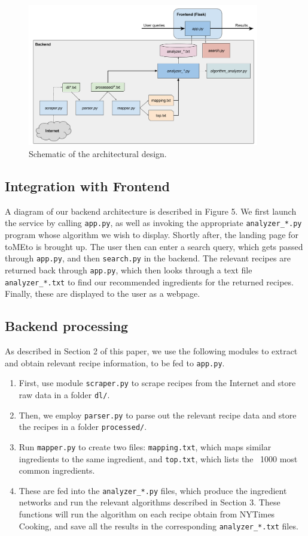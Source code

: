 \documentclass{acm_proc_article-sp}
\begin{document}
\begin{figure}[t]
	\centering
	\includegraphics[width=0.9\textwidth]{architecture}
	\caption{Schematic of the architectural design.}
	\label{fig:}
\end{figure}

\subsection{Integration with Frontend}
A diagram of our backend architecture is described in Figure 5. We first launch the service by calling \texttt{app.py}, as well as invoking the appropriate \texttt{analyzer\_*.py} program whose algorithm we wish to display. Shortly after, the landing page for toMEto is brought up. The user then can enter a search query,
which gets passed through \texttt{app.py}, and then \texttt{search.py} in the backend. The relevant
recipes are returned back through \texttt{app.py}, which then looks through a text file \texttt{analyzer\_*.txt} to find our recommended ingredients for the returned recipes. Finally, these are displayed to the user 
 as a webpage.

\subsection{Backend processing}
As described in Section 2 of this paper, we use the following
modules to extract and obtain relevant recipe information, to be fed to \texttt{app.py}.
\begin{enumerate}
	\item First, use module \texttt{scraper.py} to scrape recipes from the Internet
and store raw data in a folder \texttt{dl/}. 
	\item Then, we employ \texttt{parser.py} to parse out the relevant recipe data and store the recipes in a folder \texttt{processed/}. 
	\item Run \texttt{mapper.py} to create two files: \texttt{mapping.txt}, which maps
		similar ingredients to the same ingredient, and \texttt{top.txt}, which lists
		the ~1000 most common ingredients.
	\item These are fed into the \texttt{analyzer\_*.py} files, which produce the ingredient networks
		and run the relevant algorithms described in Section 3. These functions will run
		the algorithm on each recipe obtain from NYTimes Cooking, and save all the results 
		in the corresponding \texttt{analyzer\_*.txt} files.
\end{enumerate}
\end{document}
